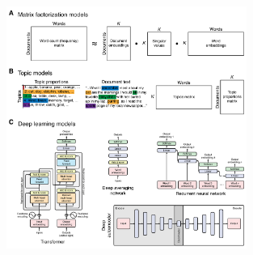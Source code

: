 \documentclass{article}
\begin{document}
\begin{figure}[tp]
\centering
\includegraphics[width=0.7\textwidth]{figs/word_embedding_models}

\end{figure}
\end{document}
